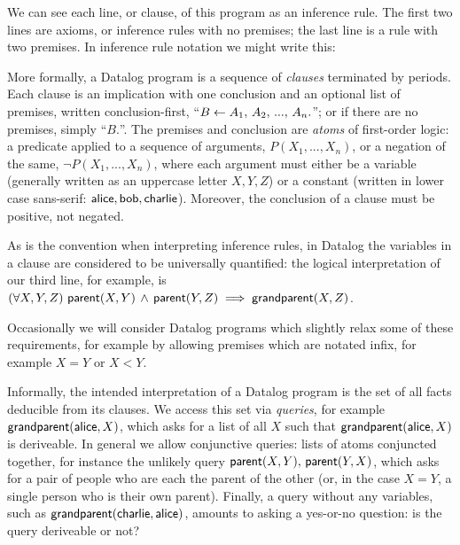 \noindent
We can see each line, or clause, of this program as an inference rule. The first
two lines are axioms, or inference rules with no premises; the last line is a
rule with two premises. In inference rule notation we might write this:
%
\begin{mathpar}


\end{mathpar}

\noindent
More formally, a Datalog program is a sequence of \emph{clauses} terminated by
periods. Each clause is an implication with one conclusion and an optional list
of premises, written conclusion-first, ``$B \gets A_1 \conj A_2 \conj ... \conj
A_n.$''; or if there are no premises, simply ``$B.$''. The premises and
conclusion are \emph{atoms} of first-order logic: a predicate applied to a
sequence of arguments, $P(X_1, ..., X_n)$, or a negation of the same, $\neg
P(X_1, ..., X_n)$, where each argument must either be a variable (generally
written as an uppercase letter $X,Y,Z$) or a constant (written in lower case
sans-serif: $\datum{alice}, \datum{bob}, \datum{charlie}$). Moreover, the
conclusion of a clause must be positive, not negated.

As is the convention when interpreting inference rules, in Datalog the variables
in a clause are considered to be universally quantified: the logical
interpretation of our third line, for example, is $\fa{X, Y, Z} \atom{parent}{X,
  Y} \wedge \atom{parent}{Y, Z} \implies \atom{grandparent}{X, Z}$.

Occasionally we will consider Datalog programs which slightly relax some of
these requirements, for example by allowing premises which are notated infix,
for example $X = Y$ or $X < Y$.

Informally, the intended interpretation of a Datalog program is the set of all
facts deducible from its clauses. We access this set via \emph{queries}, for
example $\atom{grandparent}{\datum{alice},X}$, which asks for a list of all $X$
such that $\atom{grandparent}{\datum{alice},X}$ is deriveable. In general we
allow conjunctive queries: lists of atoms conjuncted together, for instance the
unlikely query $\atom{parent}{X,Y} \conj \atom{parent}{Y,X}$, which asks for a
pair of people who are each the parent of the other (or, in the case $X = Y$, a
single person who is their own parent). Finally, a query without any variables,
such as $\atom{grandparent}{\datum{charlie}, \datum{alice}}$, amounts to asking a
yes-or-no question: is the query deriveable or not?


